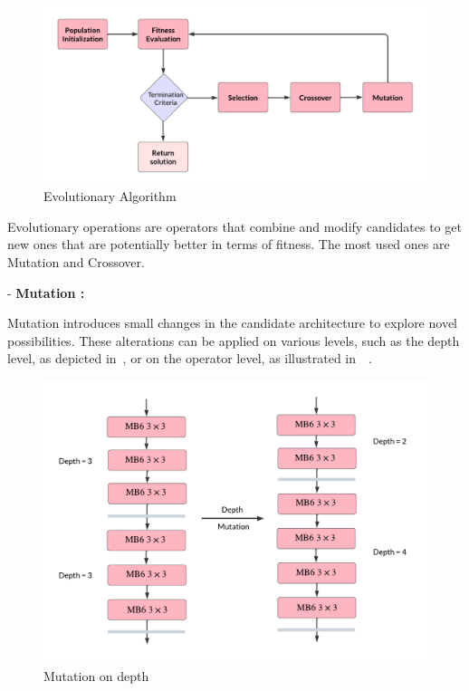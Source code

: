             \begin{figure}[hbt!]
                \begin{center}
                \includegraphics[width=.9\textwidth]{assets/images/evolutionary.png}
                \end{center}
                \caption{Evolutionary Algorithm}%
                \label{fig:hw-nas:nas:evolutionary}
            \end{figure}

            Evolutionary operations are operators that combine and modify candidates to get new ones that are potentially better in terms of  fitness. The most used ones are Mutation and Crossover.
    
                - \textbf{Mutation :}
                
                    Mutation introduces small changes in the candidate architecture to explore novel possibilities. These alterations can be applied on various levels, such as the depth level, as depicted in~, or on the operator level, as illustrated in~~\cite{onceforall}.

                    \begin{figure}[hbt!]
                        \begin{center}
                        \includegraphics[width=.6\textwidth]{assets/images/mutdepth.png}
                        \end{center}
                        \caption{Mutation on depth}%
                        \label{fig:hw-nas:nas:mudepth}
                    \end{figure}

